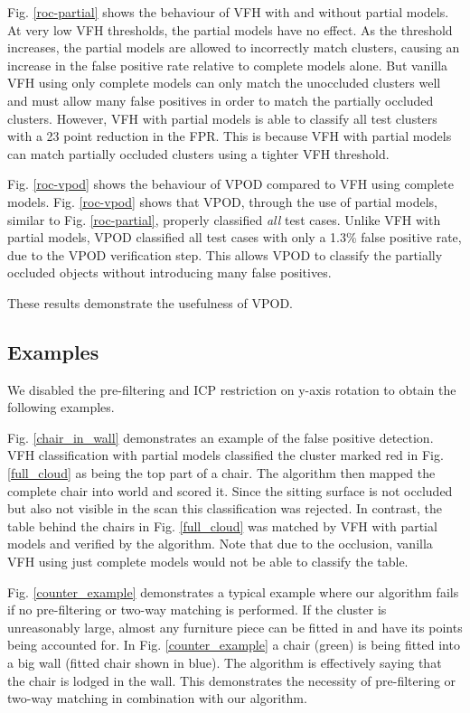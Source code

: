 \documentclass[letterpaper, 10pt, conference]{ieeeconf}
\begin{document}
Fig. \ref{roc-partial} shows the behaviour of VFH with and without partial models. 
At very low VFH thresholds, the partial models have no effect. 
As the threshold increases, the partial models are allowed to incorrectly match clusters, 
causing an increase in the false positive rate relative to complete models
alone. But vanilla VFH using only complete models can only match the unoccluded
clusters well and must allow many false positives in order to match the partially occluded clusters. However, VFH with partial models is able to classify all test clusters with a 23 point reduction in the FPR. This is because VFH with partial models can match partially occluded clusters using a tighter VFH threshold.

Fig. \ref{roc-vpod} shows the behaviour of VPOD compared to VFH using complete
models. Fig. \ref{roc-vpod} shows that VPOD, through the use of partial models,
similar to Fig. \ref{roc-partial}, properly classified \emph{all} test
cases. Unlike VFH with partial models, VPOD classified all test cases with only a 1.3\% false positive rate, due to the VPOD verification step. This allows VPOD to classify the partially occluded objects without introducing many false positives.

These results demonstrate the usefulness of VPOD.
\subsection{Examples}
\label{examples}
We disabled the pre-filtering and ICP restriction on y-axis rotation to obtain the following examples.

Fig. \ref{chair_in_wall} demonstrates an example of the false positive
detection. VFH classification with partial models classified the cluster marked red in Fig. \ref{full_cloud} 
as being the top part of a chair. The algorithm then mapped the complete chair
into world and scored it. Since the sitting surface is not occluded but also not visible in the scan this classification was rejected. 
In contrast, the table behind the chairs in Fig. \ref{full_cloud} was matched by VFH with partial models and verified 
by the algorithm. Note that due to the occlusion, vanilla VFH using just
complete models would not be able to classify the table.

Fig. \ref{counter_example} demonstrates a typical example where our algorithm fails if no pre-filtering or two-way matching is performed. If the cluster is unreasonably large, almost any furniture piece can be fitted in and have its points being accounted for. In Fig. \ref{counter_example} a chair (green) is being fitted into a big wall (fitted chair shown in blue). The algorithm is effectively saying that the chair is lodged in the wall. This demonstrates the necessity of pre-filtering or two-way matching in combination with our algorithm.
\end{document}
